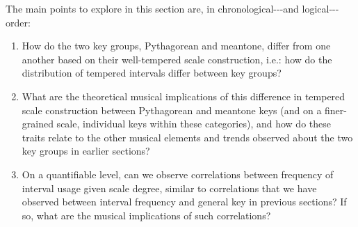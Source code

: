 The main points to explore in this section are, in
chronological-\/-\/-and logical-\/-\/-order:

\begin{enumerate}
\def\labelenumi{\arabic{enumi}.}
\tightlist
\item
  How do the two key groups, Pythagorean and meantone, differ from one
  another based on their well-tempered scale construction, i.e.: how do
  the distribution of tempered intervals differ between key groups?
\item
  What are the theoretical musical implications of this difference in
  tempered scale construction between Pythagorean and meantone keys (and
  on a finer-grained scale, individual keys within these categories),
  and how do these traits relate to the other musical elements and
  trends observed about the two key groups in earlier sections?
\item
  On a quantifiable level, can we observe correlations between frequency
  of interval usage given scale degree, similar to correlations that we
  have observed between interval frequency and general key in previous
  sections? If so, what are the musical implications of such
  correlations?
\end{enumerate}

